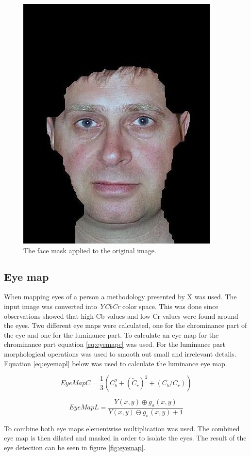 \begin{figure}[htbp]
  \centering
  \includegraphics[width=0.6\columnwidth]{images/skinmask.jpg}
  \caption{The face mask applied to the original image.}
  \label{fig:skinmask}
\end{figure}

\subsection{Eye map}
When mapping eyes of a person a methodology presented by X was used. The input
image was converted into \emph{YCbCr} color space. This was done since
observations showed that high Cb values and low Cr values were found around
the eyes. Two different eye maps were calculated, one for the chrominance part
of the eye and one for the luminance part. To calculate an eye map for the
chrominance part equation \ref{eq:eyemapc} was used. For the luminance part
morphological operations was used to smooth out small and irrelevant details.
Equation \ref{eq:eyemapl} below was used to calculate the luminance eye map.

\begin{equation}
  EyeMapC = \frac{1}{3}(C_b^2 + (\widetilde{C}_r)^2 + (C_b/C_r))
  \label{eq:eyemapc}
\end{equation}

\begin{equation}
  EyeMapL = \frac{Y(x, y)\oplus g_\sigma (x,y)}{Y(x, y)\ominus g_\sigma (x,y) + 1}
  \label{eq:eyemapl}
\end{equation}

To combine both eye maps elementwise multiplication was used. The combined eye
map is then dilated and masked in order to isolate the eyes. The result of the
eye detection can be seen in figure \ref{fig:eyemap}.

